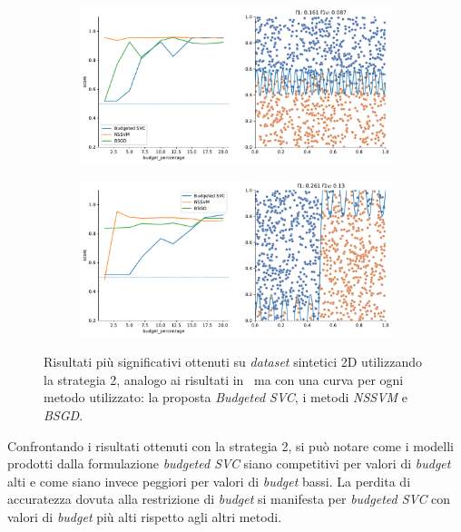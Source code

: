 \begin{figure}
\begin{subfigure}{.5\textwidth}
    \end{subfigure}%
    \hfill
    \begin{subfigure}{.5\textwidth}
        \centering
        \includegraphics[width=\textwidth]{img/comp_new/14.pdf}
    \end{subfigure}
    \begin{subfigure}{.5\textwidth}
        \centering
        \includegraphics[width=\textwidth]{img/comp_new/15.pdf}
    \end{subfigure}
\caption[Risultati su \emph{dataset} sintetici utilizzando strategia 2 in confronto ad altri metodi.]{Risultati più significativi ottenuti su \emph{dataset} sintetici 2D utilizzando la strategia 2, analogo ai risultati in~ ma con una curva per ogni metodo utilizzato: la proposta \emph{Budgeted SVC}, i metodi \emph{NSSVM} e \emph{BSGD}.}
\label{fig:comp_new}
\end{figure}
Confrontando i risultati ottenuti con la strategia 2, si può notare come i modelli prodotti dalla formulazione \emph{budgeted SVC} siano competitivi per valori di \emph{budget} alti e come siano invece peggiori per valori di \emph{budget} bassi. 
La perdita di accuratezza dovuta alla restrizione di \emph{budget} si manifesta per \emph{budgeted SVC} con valori di \emph{budget} più alti rispetto agli altri metodi.

